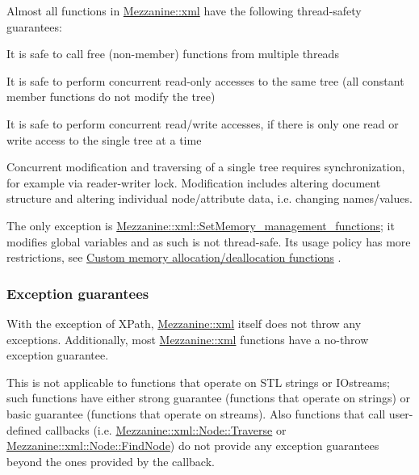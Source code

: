 Almost all functions in \hyperlink{namespaceMezzanine_1_1xml}{Mezzanine::xml} have the following thread-\/safety guarantees:
\begin{DoxyItemize}
\item It is safe to call free (non-\/member) functions from multiple threads
\item It is safe to perform concurrent read-\/only accesses to the same tree (all constant member functions do not modify the tree)
\item It is safe to perform concurrent read/write accesses, if there is only one read or write access to the single tree at a time
\end{DoxyItemize}

Concurrent modification and traversing of a single tree requires synchronization, for example via reader-\/writer lock. Modification includes altering document structure and altering individual node/attribute data, i.e. changing names/values. \par
 \par
 The only exception is \hyperlink{namespaceMezzanine_1_1xml_aca6a20ae32bb7188fc0248c257464956}{Mezzanine::xml::SetMemory\_\-management\_\-functions}; it modifies global variables and as such is not thread-\/safe. Its usage policy has more restrictions, see \hyperlink{XMLManual_XMLCustomAlloc}{Custom memory allocation/deallocation functions} . \par
 \par
 \hypertarget{XMLManual_XMLExceptionSafety}{}\subsubsection{Exception guarantees}\label{XMLManual_XMLExceptionSafety}
With the exception of XPath, \hyperlink{namespaceMezzanine_1_1xml}{Mezzanine::xml} itself does not throw any exceptions. Additionally, most \hyperlink{namespaceMezzanine_1_1xml}{Mezzanine::xml} functions have a no-\/throw exception guarantee. \par
 \par
 This is not applicable to functions that operate on STL strings or IOstreams; such functions have either strong guarantee (functions that operate on strings) or basic guarantee (functions that operate on streams). Also functions that call user-\/defined callbacks (i.e. \hyperlink{classMezzanine_1_1xml_1_1Node_a3115c4b78afaa9b27a54c1d4200dbcc7}{Mezzanine::xml::Node::Traverse} or \hyperlink{classMezzanine_1_1xml_1_1Node_a0f241f6570fd68540578859c189155c8}{Mezzanine::xml::Node::FindNode}) do not provide any exception guarantees beyond the ones provided by the callback. \par
